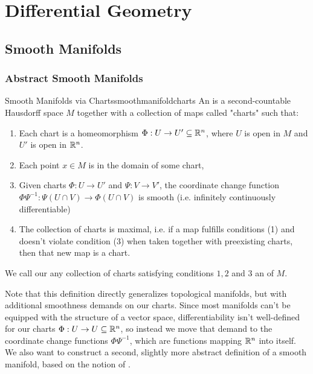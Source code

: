 \part{Differential Geometry}
\chapter{Smooth Manifolds}
\section{Abstract Smooth Manifolds}
\begin{importantdefinition}{Smooth Manifolds via Charts}{smoothmanifoldcharts}
	An  is a second-countable Hausdorff space $M$ together with a collection of maps called "charts" such that:
	\begin{enumerate}
		\item Each chart is a homeomorphism $\Phi : U \to U' \subseteq \mathbb{R}^n$, where $U$ is open in $M$ and $U'$ is open in $\mathbb{R}^n$.
		\item Each point $x \in M$ is in the domain of some chart,
		\item Given charts $\Phi : U \to U'$ and $\Psi : V \to V'$, the coordinate change function $\Phi\Psi^{-1} : \Psi(U \cap V) \to \Phi(U \cap V)$ is smooth (i.e. infinitely continuously differentiable)
		\item The collection of charts is maximal, i.e. if a map fulfills conditions (1) and doesn't violate condition (3) when taken together with preexisting charts, then that new map is a chart.
	\end{enumerate}
	We call our any collection of charts satisfying conditions $1,2$ and $3$ an  of $M$.
\end{importantdefinition}
Note that this definition directly generalizes topological manifolds, but with additional smoothness demands on our charts. Since most manifolds can't be equipped with the structure of a vector space, differentiability isn't well-defined for our charts $\Phi : U \to U \subseteq \mathbb{R}^n$, so instead we move that demand to the coordinate change functions $\Phi\Psi^{-1}$, which are functions mapping $\mathbb{R}^n$ into itself.
\newpar
We also want to construct a second, slightly more abstract definition of a smooth manifold, based on the notion of .
